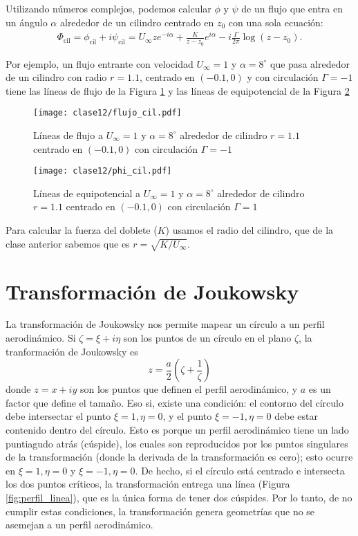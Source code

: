 Utilizando números complejos, podemos calcular $\phi$ y $\psi$ de un flujo que entra en un ángulo $\alpha$ alrededor de un cilindro centrado en $z_0$ con una sola ecuación:
%
\begin{align} \label{eq:cilindro}
\Phi_\text{cil} = \phi_\text{cil}+i\psi_\text{cil} = U_\infty z e^{-i\alpha} + \frac{K}{z-z_0}e^{i\alpha} -i\frac{\Gamma}{2\pi} \log(z-z_0).
\end{align}

Por ejemplo, un flujo entrante con velocidad $U_\infty=1$ y $\alpha=8^\circ$ que pasa alrededor de un cilindro con radio $r=1.1$, centrado en $(-0.1,0)$ y con circulación $\Gamma=-1$ tiene las líneas de flujo de la Figura \ref{fig:flujo_cil} y las líneas de equipotencial de la Figura \ref{fig:phi_cil}
%
\begin{figure}[h!]
\centering
\texttt{[image: clase12/flujo\_cil.pdf]}
\caption{Líneas de flujo a $U_\infty=1$ y $\alpha=8^\circ$ alrededor de cilindro $r=1.1$ centrado en $(-0.1,0)$ con circulación $\Gamma=-1$}\label{fig:flujo_cil}
\end{figure}
%
\begin{figure}[h!]
\centering
\texttt{[image: clase12/phi\_cil.pdf]}
\caption{Líneas de equipotencial a $U_\infty=1$ y $\alpha=8^\circ$ alrededor de cilindro $r=1.1$ centrado en $(-0.1,0)$ con circulación $\Gamma=1$}\label{fig:phi_cil}
\end{figure}

Para calcular la fuerza del doblete ($K$) usamos el radio del cilindro, que de la clase anterior sabemos que es $r=\sqrt{K/U_\infty}$.

\section*{Transformación de Joukowsky}

La transformación de Joukowsky nos permite mapear un círculo a un perfil aerodinámico. 
Si $\zeta = \xi + i\eta$ son los puntos de un círculo en el plano $\zeta$, la tranformación de Joukowsky es
%
\begin{equation}
z = \frac{a}{2}\left(\zeta + \frac{1}{\zeta}\right)
\end{equation}
%
donde $z=x+iy$ son los puntos que definen el perfil aerodinámico, y $a$ es un factor que define el tamaño. 
Eso si, existe una condición: el contorno del círculo debe intersectar el punto $\xi=1, \eta=0$, y el punto $\xi=-1, \eta=0$ debe estar contenido dentro del círculo. 
Esto es porque un perfil aerodinámico tiene un lado puntiagudo atrás (cúspide), los cuales son reproducidos por los puntos singulares de la transformación (donde la derivada de la transformación es cero); esto ocurre en $\xi=1, \eta=0$ y $\xi=-1, \eta=0$.
De hecho, si el círculo está centrado e intersecta los dos puntos críticos, la transformación entrega una línea (Figura \ref{fig:perfil_linea}), que es la única forma de tener dos cúspides.
Por lo tanto, de no cumplir estas condiciones, la transformación genera geometrías que no se asemejan a un perfil aerodinámico.

